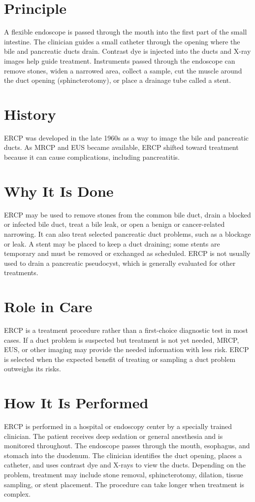 \section*{Principle}
A flexible endoscope is passed through the mouth into the first part of the small intestine. The clinician guides a small catheter through the opening where the bile and pancreatic ducts drain. Contrast dye is injected into the ducts and X-ray images help guide treatment. Instruments passed through the endoscope can remove stones, widen a narrowed area, collect a sample, cut the muscle around the duct opening (sphincterotomy), or place a drainage tube called a stent.

\section*{History}
ERCP was developed in the late 1960s as a way to image the bile and pancreatic ducts. As MRCP and EUS became available, ERCP shifted toward treatment because it can cause complications, including pancreatitis.

\section*{Why It Is Done}
ERCP may be used to remove stones from the common bile duct, drain a blocked or infected bile duct, treat a bile leak, or open a benign or cancer-related narrowing. It can also treat selected pancreatic duct problems, such as a blockage or leak. A stent may be placed to keep a duct draining; some stents are temporary and must be removed or exchanged as scheduled. ERCP is not usually used to drain a pancreatic pseudocyst, which is generally evaluated for other treatments.

\section*{Role in Care}
ERCP is a treatment procedure rather than a first-choice diagnostic test in most cases. If a duct problem is suspected but treatment is not yet needed, MRCP, EUS, or other imaging may provide the needed information with less risk. ERCP is selected when the expected benefit of treating or sampling a duct problem outweighs its risks.

\section*{How It Is Performed}
ERCP is performed in a hospital or endoscopy center by a specially trained clinician. The patient receives deep sedation or general anesthesia and is monitored throughout. The endoscope passes through the mouth, esophagus, and stomach into the duodenum. The clinician identifies the duct opening, places a catheter, and uses contrast dye and X-rays to view the ducts. Depending on the problem, treatment may include stone removal, sphincterotomy, dilation, tissue sampling, or stent placement. The procedure can take longer when treatment is complex.


